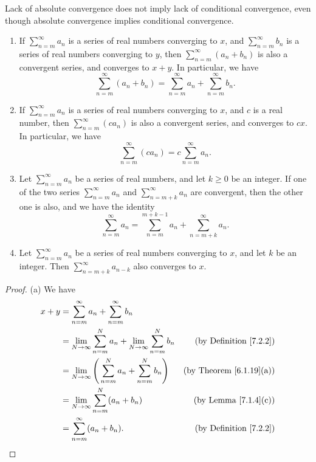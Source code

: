 \begin{note}
    Lack of absolute convergence does not imply lack of conditional convergence, even though absolute convergence implies conditional convergence.
\end{note}

\setcounter{theorem}{13}
\begin{proposition}\label{7.2.14}
    \mbox{}
    \begin{enumerate}
        \item If \(\sum_{n = m}^\infty a_n\) is a series of real numbers converging to \(x\), and \(\sum_{n = m}^\infty b_n\) is a series of real numbers converging to \(y\), then \(\sum_{n = m}^\infty (a_n + b_n)\) is also a convergent series, and converges to \(x + y\).
              In particular, we have
              \[
                  \sum_{n = m}^\infty (a_n + b_n) = \sum_{n = m}^\infty a_n + \sum_{n = m}^\infty b_n.
              \]
        \item If \(\sum_{n = m}^\infty a_n\) is a series of real numbers converging to \(x\), and \(c\) is a real number, then \(\sum_{n = m}^\infty (c a_n)\) is also a convergent series, and converges to \(cx\).
              In particular, we have
              \[
                  \sum_{n = m}^\infty (c a_n) = c \sum_{n = m}^\infty a_n.
              \]
        \item Let \(\sum_{n = m}^\infty a_n\) be a series of real numbers, and let \(k \geq 0\) be an integer.
              If one of the two series \(\sum_{n = m}^\infty a_n\) and \(\sum_{n = m + k}^\infty a_n\) are convergent, then the other one is also, and we have the identity
              \[
                  \sum_{n = m}^\infty a_n = \sum_{n = m}^{m + k - 1} a_n + \sum_{n = m + k}^\infty a_n.
              \]
        \item Let \(\sum_{n = m}^\infty a_n\) be a series of real numbers converging to \(x\), and let \(k\) be an integer.
              Then \(\sum_{n = m + k}^\infty a_{n - k}\) also converges to \(x\).
    \end{enumerate}
\end{proposition}

\begin{proof}{(a)}
    We have
    \begin{align*}
        x + y & = \sum_{n = m}^\infty a_n + \sum_{n = m}^\infty b_n                                                                     \\
              & = \lim_{N \to \infty} \sum_{n = m}^N a_n + \lim_{N \to \infty} \sum_{n = m}^N b_n & \text{(by Definition \ref{7.2.2})}  \\
              & = \lim_{N \to \infty} \Bigg(\sum_{n = m}^N a_n + \sum_{n = m}^N b_n\Bigg)         & \text{(by Theorem \ref{6.1.19}(a))} \\
              & = \lim_{N \to \infty} \sum_{n = m}^N (a_n + b_n)                                  & \text{(by Lemma \ref{7.1.4}(c))}    \\
              & = \sum_{n = m}^\infty (a_n + b_n).                                                & \text{(by Definition \ref{7.2.2})}
    \end{align*}
\end{proof}

